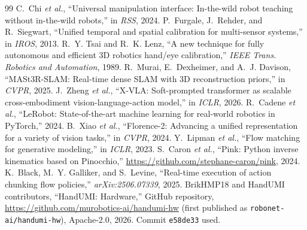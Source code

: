 \documentclass[conference,10pt]{IEEEtran}
\begin{document}
\begin{thebibliography}{99}\footnotesize
{} C.~Chi \emph{et al.}, ``Universal manipulation interface: In-the-wild robot teaching without in-the-wild robots,'' in \emph{RSS}, 2024.
 P.~Furgale, J.~Rehder, and R.~Siegwart, ``Unified temporal and spatial calibration for multi-sensor systems,'' in \emph{IROS}, 2013.
 R.~Y. Tsai and R.~K. Lenz, ``A new technique for fully autonomous and efficient 3D robotics hand/eye calibration,'' \emph{IEEE Trans. Robotics and Automation}, 1989.
 R.~Murai, E.~Dexheimer, and A.~J. Davison, ``MASt3R-SLAM: Real-time dense SLAM with 3D reconstruction priors,'' in \emph{CVPR}, 2025.
 J.~Zheng \emph{et al.}, ``X-VLA: Soft-prompted transformer as scalable cross-embodiment vision-language-action model,'' in \emph{ICLR}, 2026.
 R.~Cadene \emph{et al.}, ``LeRobot: State-of-the-art machine learning for real-world robotics in PyTorch,'' 2024.
 B.~Xiao \emph{et al.}, ``Florence-2: Advancing a unified representation for a variety of vision tasks,'' in \emph{CVPR}, 2024.
 Y.~Lipman \emph{et al.}, ``Flow matching for generative modeling,'' in \emph{ICLR}, 2023.
 S.~Caron \emph{et al.}, ``Pink: Python inverse kinematics based on Pinocchio,'' \url{https://github.com/stephane-caron/pink}, 2024.
 K.~Black, M.~Y. Galliker, and S.~Levine, ``Real-time execution of action chunking flow policies,'' \emph{arXiv:2506.07339}, 2025.
 BrikHMP18 and HandUMI contributors, ``HandUMI: Hardware,'' GitHub repository, \url{https://github.com/murobotics-ai/handumi-hw} (first published as \texttt{robonet-ai/handumi-hw}), Apache-2.0, 2026. Commit \texttt{e58de33} used.
\end{thebibliography}
\end{document}
